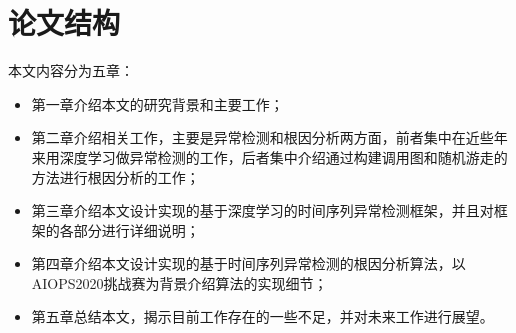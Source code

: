 \section{论文结构}
本文内容分为五章：
\begin{itemize}
    \item 第一章介绍本文的研究背景和主要工作；
    \item 第二章介绍相关工作，主要是异常检测和根因分析两方面，前者集中在近些年来用深度学习做异常检测的工作，后者集中介绍通过构建调用图和随机游走的方法进行根因分析的工作；
    \item 第三章介绍本文设计实现的基于深度学习的时间序列异常检测框架，并且对框架的各部分进行详细说明；
    \item 第四章介绍本文设计实现的基于时间序列异常检测的根因分析算法，以AIOPS2020挑战赛为背景介绍算法的实现细节；
    \item 第五章总结本文，揭示目前工作存在的一些不足，并对未来工作进行展望。
\end{itemize}